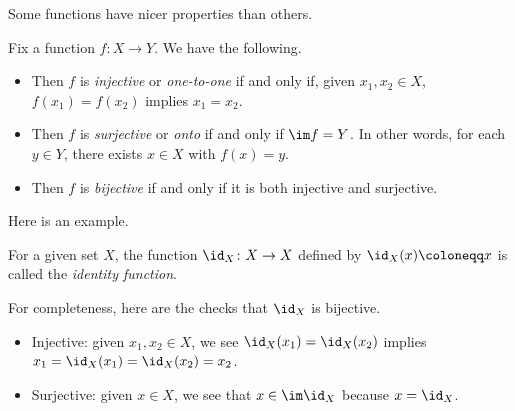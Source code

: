 Some functions have nicer properties than others.
\begin{definition}
	Fix a function $f\colon X\to Y$. We have the following.
	\begin{itemize}
		\item Then $f$ is \textit{injective} or \textit{one-to-one} if and only if, given $x_1,x_2\in X$, $f(x_1)=f(x_2)$ implies $x_1=x_2$.
		\item Then $f$ is \textit{surjective} or \textit{onto} if and only if $\im f=Y$. In other words, for each $y\in Y$, there exists $x\in X$ with $f(x)=y$.
		\item Then $f$ is \textit{bijective} if and only if it is both injective and surjective.
	\end{itemize}
\end{definition}
Here is an example.
\begin{definition}[Identity]
	For a given set $X$, the function $\id_X\colon X\to X$ defined by $\id_X(x)\coloneqq x$ is called the \textit{identity function}.
\end{definition}
For completeness, here are the checks that $\id_X$ is bijective.
\begin{itemize}
	\item Injective: given $x_1,x_2\in X$, we see $\id_X(x_1)=\id_X(x_2)$ implies $x_1=\id_X(x_1)=\id_X(x_2)=x_2$.
	\item Surjective: given $x\in X$, we see that $x\in\im\id_X$ because $x=\id_X$.
\end{itemize}


